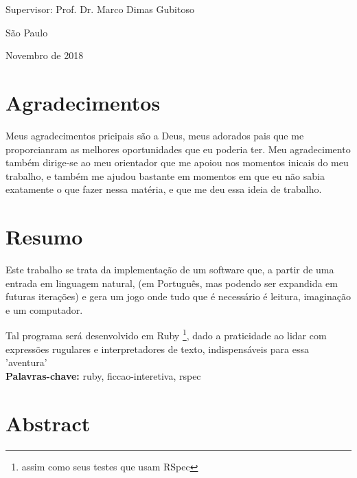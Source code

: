 \documentclass[12pt,twoside,a4paper,openany]{book}
\begin{document}
    \begin{center}
        Supervisor: Prof. Dr. Marco Dimas Gubitoso

        \vskip 5cm
        \normalsize{São Paulo}

        \normalsize{Novembro de 2018}
    \end{center}
    \pagebreak





    \chapter*{Agradecimentos}

    Meus agradecimentos pricipais são a Deus, meus adorados pais que me proporcianram
    as melhores oportunidades que eu poderia ter. Meu agradecimento também dirige-se
    ao meu orientador que me apoiou nos momentos inicais do meu trabalho, e também me
    ajudou bastante em momentos em que eu não sabia exatamente o que fazer nessa
    matéria, e que me deu essa ideia de trabalho.



    \chapter*{Resumo}


    Este trabalho se trata da implementação de um software que, a partir de uma entrada em linguagem
    natural, (em Português, mas podendo ser expandida em futuras iterações) e gera um jogo onde
    tudo que é necessário é leitura, imaginação e um computador.

    Tal programa será desenvolvido em Ruby \footnote{assim como seus testes que usam RSpec}, dado a
    praticidade ao lidar com expressões rugulares e interpretadores de texto, indispensáveis para
    essa 'aventura'
    \\


    \noindent \textbf{Palavras-chave:} ruby, ficcao-interetiva, rspec

    \chapter*{Abstract}
\end{document}
